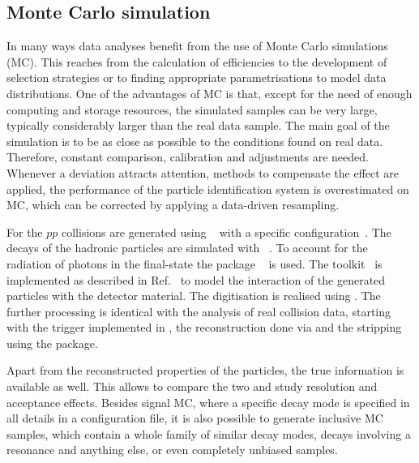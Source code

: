 
\subsection{Monte Carlo simulation}
\label{sec:detector:software:simulation}

In many ways data analyses benefit from the use of Monte Carlo simulations
(MC). This reaches from the calculation of efficiencies to the development of
selection strategies or to finding appropriate parametrisations to model data
distributions. One of the advantages of MC is that, except for the need of
enough computing and storage resources, the simulated samples can be very
large, typically considerably larger than the real data sample. The main goal
of the simulation is to be as close as possible to the conditions found on
real data. Therefore, constant comparison, calibration and adjustments are
needed. Whenever a deviation attracts attention, methods to compensate the
effect are applied, \eg the performance of the particle identification system
is overestimated on MC, which can be corrected by applying a data-driven
resampling.

For \lhcb the $pp$ collisions are generated using
\pythia~\cite{Sjostrand:2006za,*Sjostrand:2007gs} with a specific
configuration~\cite{LHCb-PROC-2010-056}. The decays of the hadronic particles
are simulated with \evtgen~\cite{Lange:2001uf}. To account for the radiation
of photons in the final-state the package
\photos~\cite{Golonka:2005pn} is used. The \geant
toolkit~\cite{Allison:2006ve, *Agostinelli:2002hh} is implemented as described
in Ref.~\cite{LHCb-PROC-2011-006} to model the interaction of the generated
particles with the detector material. The digitisation is realised using
\boole. The further processing is identical with the analysis of real
collision data, starting with the trigger implemented in \moore, the
reconstruction done via \brunel and the stripping using the \davinci package.

Apart from the reconstructed properties of the particles, the true information
is available as well. This allows to compare the two and study resolution and
acceptance effects. Besides signal MC, where a specific decay mode is
specified in all details in a configuration file, it is also possible to
generate inclusive MC samples, which contain a whole family of similar decay
modes, \eg decays involving a \jpsi resonance and anything else, or even
completely unbiased samples.

